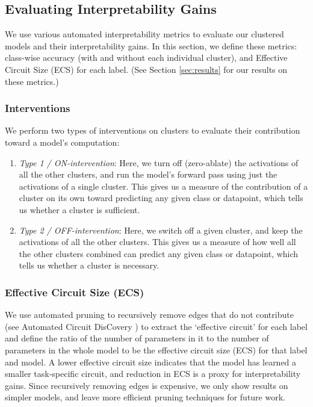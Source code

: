 \subsection{Evaluating Interpretability Gains}
\label{subsec:evals}

We use various automated interpretability metrics to evaluate our clustered models and their interpretability gains. In this section, we define these metrics: class-wise accuracy (with and without each individual cluster), and Effective Circuit Size (ECS) for each label. (See Section \ref{sec:results} for our results on these metrics.)

\subsubsection{Interventions}
\label{subsec:interventions}

We perform two types of interventions on clusters to evaluate their contribution toward a model's computation:
\begin{enumerate}
    \item \textit{Type 1 / ON-intervention}: Here, we turn off (zero-ablate) the activations of all the other clusters, and run the model's forward pass using just the activations of a single cluster. This gives us a measure of the contribution of a cluster on its own toward predicting any given class or datapoint, which tells us whether a cluster is sufficient.
    \item \textit{Type 2 / OFF-intervention}: Here, we switch off a given cluster, and keep the activations of all the other clusters. This gives us a measure of how well all the other clusters combined can predict any given class or datapoint, which tells us whether a cluster is necessary.
\end{enumerate}

\subsubsection{Effective Circuit Size (ECS)}\label{sec:circuit-size}

We use automated pruning to recursively remove edges that do not contribute (see Automated Circuit DisCovery \citep{conmy2023towards}) to extract the `effective circuit' for each label and define the ratio of the number of parameters in it to the number of parameters in the whole model to be the effective circuit size (ECS) for that label and model. A lower effective circuit size indicates that the model has learned a smaller task-specific circuit, and reduction in ECS is a proxy for interpretability gains. Since recursively removing edges is expensive, we only show results on simpler models, and leave more efficient pruning techniques for future work.

